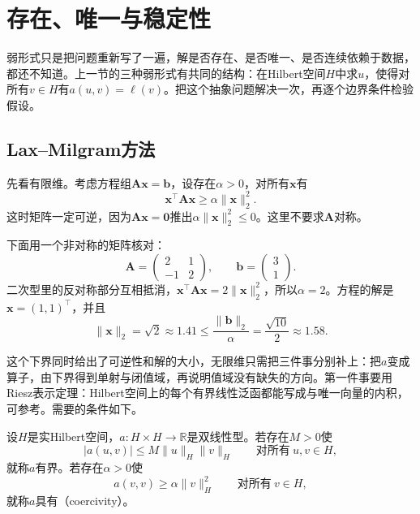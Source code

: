 \section{存在、唯一与稳定性}
\label{sec:ellip-wellposed}

弱形式只是把问题重新写了一遍，解是否存在、是否唯一、是否连续依赖于数据，都还不知道。上一节的三种弱形式有共同的结构：在Hilbert空间$H$中求$u$，使得对所有$v\in H$有$a(u,v)=\ell(v)$。把这个抽象问题解决一次，再逐个边界条件检验假设。

\subsection{Lax--Milgram方法}
\label{sec:ellip-lax-milgram}

先看有限维。考虑方程组$\bm{A}\bm{x}=\bm{b}$，设存在$\alpha>0$，对所有$\bm{x}$有
\[
 \bm{x}^\top\bm{A}\bm{x}\geq\alpha\lVert\bm{x}\rVert_2^2 .
\]
这时矩阵一定可逆，因为$\bm{A}\bm{x}=\bm{0}$推出$\alpha\lVert\bm{x}\rVert_2^2\leq0$。这里不要求$\bm{A}$对称。

下面用一个非对称的矩阵核对：
\[
 \bm{A}=\begin{pmatrix}2&1\\-1&2\end{pmatrix},\qquad\bm{b}=\begin{pmatrix}3\\1\end{pmatrix}.
\]
二次型里的反对称部分互相抵消，$\bm{x}^\top\bm{A}\bm{x}=2\lVert\bm{x}\rVert_2^2$，所以$\alpha=2$。方程的解是$\bm{x}=(1,1)^\top$，并且
\[
 \lVert\bm{x}\rVert_2=\sqrt2\approx1.41\leq\frac{\lVert\bm{b}\rVert_2}{\alpha}=\frac{\sqrt{10}}2\approx1.58 .
\]

这个下界同时给出了可逆性和解的大小，无限维只需把三件事分别补上：把$a$变成算子，由下界得到单射与闭值域，再说明值域没有缺失的方向。第一件事要用Riesz表示定理：Hilbert空间上的每个有界线性泛函都能写成与唯一向量的内积，可参考。需要的条件如下。

\begin{definition}[有界与强制]
\label{def:ellip-bounded-coercive}
设$H$是实Hilbert空间，$a:H\times H\to\mathbb{R}$是双线性型。若存在$M>0$使
\begin{equation}
 \lvert a(u,v)\rvert\leq M\lVert u\rVert_H\lVert v\rVert_H\qquad\text{对所有}\ u,v\in H,
 \label{eq:ellip-bounded}
\end{equation}
就称$a$有界。若存在$\alpha>0$使
\begin{equation}
 a(v,v)\geq\alpha\lVert v\rVert_H^2\qquad\text{对所有}\ v\in H,
 \label{eq:ellip-coercive}
\end{equation}
就称$a$具有（coercivity）。
\end{definition}


